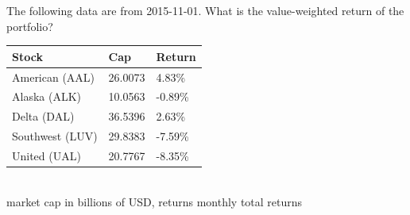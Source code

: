 The following data are from 2015-11-01. What is the value-weighted return of the portfolio?
\begin{center}
	\begin{tabular}{l|ll}
		\textbf{Stock} & \textbf{Cap} & \textbf{Return} \\ \hline
		American (AAL) & 26.0073 & 4.83\% \\
		Alaska (ALK) & 10.0563 & -0.89\% \\
		Delta (DAL) & 36.5396 & 2.63\% \\
		Southwest (LUV) & 29.8383 & -7.59\% \\
		United (UAL) & 20.7767 & -8.35\%\\\hline
	\end{tabular}\\
	{\footnotesize market cap in billions of USD, returns monthly total returns}
\end{center}
